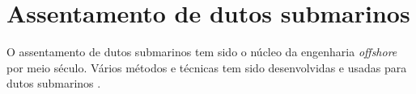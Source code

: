 \chapter{Assentamento de dutos submarinos}
\label{chap:assentamento}

O assentamento de dutos submarinos tem sido o núcleo da engenharia \textit{offshore} por meio século. Vários métodos e técnicas tem sido desenvolvidas e usadas para dutos submarinos \cite[]{Ivi2016}. 